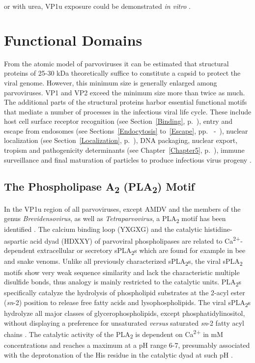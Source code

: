 or with urea, VP1u exposure could be demonstrated \textit{in vitro} \cite{pmid9927584, pmid15194745}. 
    
\section{Functional Domains}
\label{Motif}

From the atomic model of parvoviruses it can be estimated that structural proteins of 25-30 kDa theoretically suffice to constitute a capsid to protect the viral genome. However, this minimum size is generally enlarged among parvoviruses. VP1 and VP2 exceed the minimum size more than twice as much. The additional parts of the structural proteins harbor essential functional motifs that mediate a number of processes in the infectious viral life cycle. These include host cell surface receptor recognition (see Section~\ref{Binding}, p.~\pageref{Binding}), entry and escape from endosomes (see Sections~\ref{Endocytosis} to~\ref{Escape}, pp.~\pageref{Endocytosis} -~\pageref{Escape}), nuclear localization (see Section~\ref{Localization}, p.~\pageref{Localization}), DNA packaging, nuclear export, tropism and pathogenicity determinants (see Chapter~\ref{Chapter5}, p.~\pageref{Chapter5}), immune surveillance and final maturation of particles to produce infectious virus progeny \cite{PLA2}.    

\subsection{The Phospholipase A\textsubscript{2} (PLA\textsubscript{2}) Motif}
\label{PLA2}

In the VP1u region of all parvoviruses, except AMDV and the members of the genus \textit{Brevidensovirus}, as well as \textit{Tetraparvovirus}, a PLA\textsubscript{2} motif has been identified \cite{pmid11702787}. The calcium binding loop (YXGXG) and the catalytic histidine-aspartic acid dyad (HDXXY) of parvoviral phospholipases are related to Ca\textsuperscript{2+}-dependent extracellular or secretory sPLA\textsubscript{2}s which are found for example in bee and snake venoms. Unlike all previously characterized sPLA\textsubscript{2}s, the viral sPLA\textsubscript{2} motifs show very weak sequence similarity and lack the characteristic multiple disulfide bonds, thus analogy is mainly restricted to the catalytic units. PLA\textsubscript{2}s specifically catalyze the hydrolysis of phospholipid substrates at the 2-acyl ester (\textit{sn}-2) position to release free fatty acids and lysophospholipids. The viral sPLA\textsubscript{2}s hydrolyze all major classes of glycerophospholipids, except phosphatidylinositol, without displaying a preference for unsaturated \textit{versus} saturated \textit{sn}-2 fatty acyl chains \cite{pmid14726513}. The catalytic activity of the PLA\textsubscript{2} is dependent on Ca\textsuperscript{2+} in mM concentrations and reaches a maximum at a pH range 6-7, presumably associated with the deprotonation of the His residue in the catalytic dyad at such pH \cite{pmid9115999, pmid7574497}.

